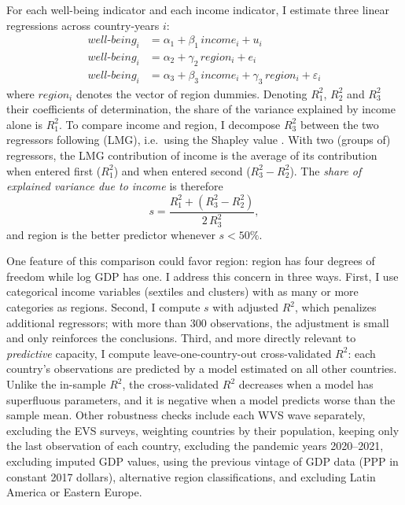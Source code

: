 \documentclass[12pt]{article}
\begin{document}
For each well-being indicator and each income indicator, I estimate three linear regressions across country-years $i$:
\begin{align}
    well\text{-}being_i &= \alpha_1 + \beta_1\, income_i + u_i \label{eq:income}\\
    well\text{-}being_i &= \alpha_2 + \gamma_2\, region_i + e_i \label{eq:region}\\
    well\text{-}being_i &= \alpha_3 + \beta_3\, income_i + \gamma_3\, region_i + \varepsilon_i \label{eq:both}
\end{align}
where $region_i$ denotes the vector of region dummies. Denoting $R^2_1$, $R^2_2$ and $R^2_3$ their coefficients of determination, the share of the variance explained by income alone is $R^2_1$. To compare income and region, I decompose $R^2_3$ between the two regressors following \citet{lindeman_introduction_1980} (LMG), i.e.\ using the Shapley value \citep{gromping_estimators_2007}. With two (groups of) regressors, the LMG contribution of income is the average of its contribution when entered first ($R^2_1$) and when entered second ($R^2_3 - R^2_2$). The \textit{share of explained variance due to income} is therefore
\begin{equation}
    s = \frac{R^2_1 + (R^2_3 - R^2_2)}{2\, R^2_3}, \label{eq:share}
\end{equation}
and region is the better predictor whenever $s < 50\%$.

One feature of this comparison could favor region: region has four degrees of freedom while log GDP has one. I address this concern in three ways. First, I use categorical income variables (sextiles and clusters) with as many or more categories as regions. Second, I compute $s$ with adjusted $R^2$, which penalizes additional regressors; with more than 300 observations, the adjustment is small and only reinforces the conclusions. Third, and more directly relevant to \textit{predictive} capacity, I compute leave-one-country-out cross-validated $R^2$: each country's observations are predicted by a model estimated on all other countries. Unlike the in-sample $R^2$, the cross-validated $R^2$ decreases when a model has superfluous parameters, and it is negative when a model predicts worse than the sample mean. Other robustness checks include each WVS wave separately, excluding the EVS surveys, weighting countries by their population, keeping only the last observation of each country, excluding the pandemic years 2020--2021, excluding imputed GDP values, using the previous vintage of GDP data (PPP in constant 2017 dollars), alternative region classifications, and excluding Latin America or Eastern Europe.
\end{document}
